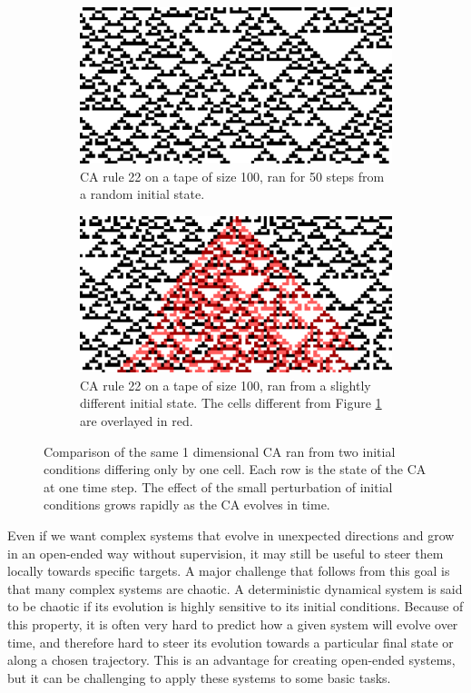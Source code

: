 \begin{figure}[htbp]
  \centering
  \begin{subfigure}[t]{.47\linewidth}
    \centering
    \includegraphics[width=.93\linewidth]{figures/ca_comp_a}
    \caption{\ac{CA} rule 22 on a tape of size 100, ran for 50 steps from a
      random initial state.}
    \label{fig:ca_comp_a}
  \end{subfigure}
  \hspace{10pt}
  \begin{subfigure}[t]{.47\linewidth}
    \centering
    \includegraphics[width=.93\linewidth]{figures/ca_comp_b}
    \caption{\ac{CA} rule 22 on a tape of size 100, ran from a slightly
      different initial state. The cells different from Figure \ref{fig:ca_comp_a} are
      overlayed in red.}
    \label{fig:ca_comp_b}
  \end{subfigure}

  \caption{Comparison of the same 1 dimensional \ac{CA} ran from two initial conditions
    differing only by one cell. Each row is the state of the \ac{CA} at one time
    step. The effect of the small perturbation of initial conditions grows
    rapidly as the \ac{CA} evolves in time.}
  \label{fig:ca_comp}
\end{figure}


Even if we want complex systems that evolve in unexpected directions and grow in
an open-ended way without supervision, it may still be useful to steer them
locally towards specific targets. A major challenge that follows from this goal
is that many complex systems are chaotic. A deterministic dynamical system is
said to be chaotic if its evolution is highly sensitive to its initial
conditions. Because of this property, it is often very hard to predict how a
given system will evolve over time, and therefore hard to steer its evolution
towards a particular final state or along a chosen trajectory. This is an
advantage for creating open-ended systems, but it can be challenging to apply
these systems to some basic tasks.

